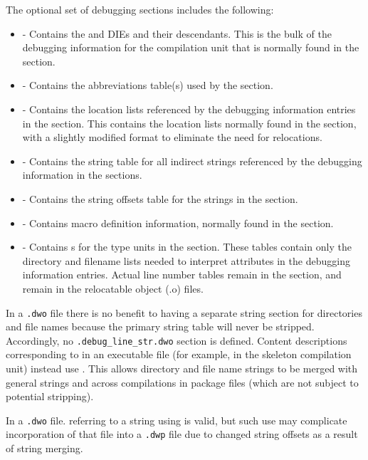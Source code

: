 The optional set of debugging sections includes the following:
\begin{itemize}
\item
\dotdebuginfodwo{} - Contains the \DWTAGcompileunit{} and
\DWTAGtypeunit{} DIEs and
their descendants. This is the bulk of the debugging
information for the compilation unit that is normally found
in the \dotdebuginfo{} section.
\item
\dotdebugabbrevdwo{} - Contains the abbreviations table(s) used by
the \dotdebuginfodwo{} section.
\item
\dotdebuglocdwo{} - Contains the location lists referenced by
the debugging information entries in the \dotdebuginfodwo{}
section. This contains the location lists normally found in 
the \dotdebugloc{} section,
with a slightly modified format to eliminate the need for
relocations.
\item
\dotdebugstrdwo{} - Contains the string table for all indirect
strings referenced by the debugging information in the
\dotdebuginfodwo{} sections.
\item
\dotdebugstroffsetsdwo{} - Contains the string offsets table
for the strings in the \dotdebugstrdwo{}{} section.
\item
\dotdebugmacrodwo{} - Contains macro definition information,
normally found in the \dotdebugmacro{} section.
\item
\dotdebuglinedwo{} - Contains s 
for the type units in the \dotdebuginfodwo{} section. These tables
contain only the directory and filename lists needed to
interpret \DWATdeclfile{} attributes in the debugging
information entries. Actual line number tables remain in the
\dotdebugline{} section, and remain in the relocatable object
(.o) files.

\end{itemize}

In a \texttt{.dwo} file there is no benefit to having a separate string
section for directories and file names because the primary
string table will never be stripped. Accordingly, no
\texttt{.debug\_line\_str.dwo} section is defined. Content descriptions 
corresponding to \DWFORMlinestrp{} in an executable file (for example, 
in the skeleton compilation unit) instead use \DWFORMstrx. This allows
directory and file name strings to be merged with general
strings and across compilations in package files (which are not
subject to potential stripping).

In a \texttt{.dwo} file. referring to a string using \DWFORMstrp{}
is valid, but such use may complicate incorporation of that file into a
\texttt{.dwp} file due to changed string offsets as a result of string merging.

